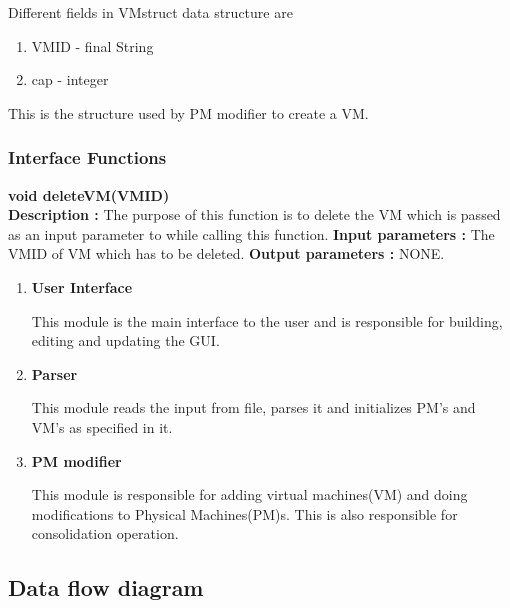 \documentclass[a4paper,11pt]{article}
\begin{document}
Different fields in VMstruct data structure are 
\begin{enumerate}
 \item VM\textunderscore ID - final String
 \item cap - integer
\end{enumerate}
This is the structure used by PM modifier to create a VM.
\subsubsection{Interface Functions}
\textbf{ void deleteVM(VM\textunderscore ID)}
\\
\textbf{Description :} The purpose of this function is to delete the VM which is passed as an input parameter to while calling this function.
\textbf{Input parameters :} The VM\textunderscore ID of VM which has to be deleted.
\textbf{Output parameters :} NONE.
\begin{enumerate}
\item \textbf{ User Interface }

This module is the main interface to the user and is responsible for building, editing and updating the GUI.
\item \textbf{ Parser }

This module reads the input from file, parses it and initializes PM’s and VM’s as specified in it.
\item \textbf{ PM modifier }

This module is responsible for adding virtual machines(VM) and doing modifications to Physical Machines(PM)s. This is also responsible for consolidation operation.

\end{enumerate}


\pagebreak
\subsection{Data flow diagram}

\end{document}
